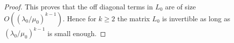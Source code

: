\documentclass[10pt,reqno]{amsart}
\newcommand{\ZZ}{\mathcal{Z}}
\newcommand{\be}{\beta}
\newcommand{\la}{\lambda}
\newcommand{\La}{\Lambda}
\newcommand{\U}{\underline}
\newcommand{\ang}[1]{\left\langle{#1}\right\rangle}
\newcommand{\abs}[1]{\left\lvert{#1}\right\rvert}
\newcommand{\EQ}[1]{\begin{equation}\begin{split} #1 \end{split}\end{equation}}
\newcommand{\pmat}[1]{\begin{pmatrix} #1 \end{pmatrix}}
\numberwithin{equation}{section}
\newtheorem{claim}[thm]{Claim}
\theoremstyle{remark}
\newcommand{\rest}{\!\!\restriction}
\newcommand{\ula}{\underline{\lambda}}
\newcommand{\umu}{\underline{\mu}}
\newcommand{\0}{\emptyset}
\begin{document}
\begin{proof}
This proves that the off diagonal terms in $L_0$ are of size $O((\la_0/\mu_0)^{k-1})$.
Hence for $k \ge 2$ the matrix $L_0$ is invertible as long as $(\la_0/\mu_0)^{k-1}$  is small enough.


\end{proof}
\end{document}
